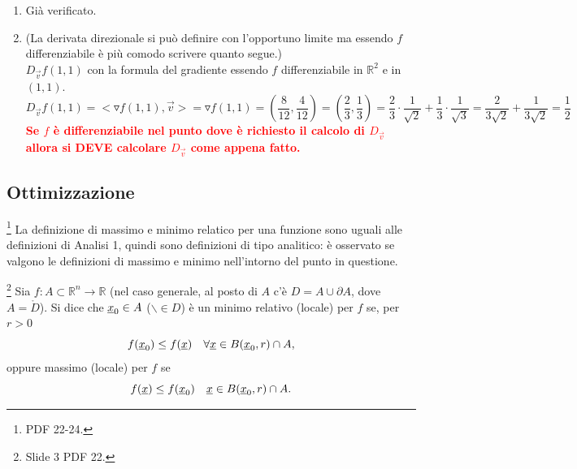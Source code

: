 \begin{example}
\begin{enumerate}
\begin{enumerate}
		\paragraph{Intermezzo:} $\rho^{\frac{15}{3}-4}$  tende a 0 e $\cos\theta)^{\frac{10}{3}}(\sin\theta)^{\frac{5}{3}}+7(\cos\theta)^{\frac{4}{3}}(\sin\theta)^{\frac{11}{3}} $ è uniformemente limitata perché somme di $\sin$ e $\cos$. Lo stesso si può concludere per $f_y$, qundi vale quanto segue. $\qed$\\
		Quindi $f\in C^1(\mathbb{R}^2)$ e $f$ è differenziabile in $\mathbb{R}^2$ (quindi anche in $(0,0)$).
		\item Già verificato.
		\item (La derivata direzionale si può definire con l'opportuno limite ma essendo $f$ differenziabile è più comodo scrivere quanto segue.)\\
		$D_{\vec{v}}f(1,1)$ con la formula del gradiente essendo $f$ differenziabile in $\mathbb{R}^2$ e in $(1,1)$.
		\begin{equation*}
			D_{\vec{v}}f(1,1) = <\triangledown f(1,1), \vec{v}> = \triangledown f(1,1) = \left(\frac{8}{12}, \frac{4}{12}\right) = \left(\frac{2}{3}, \frac{1}{3}\right) = \frac{2}{3}\cdot\frac{1}{\sqrt{2}} + \frac{1}{3}\cdot\frac{1}{\sqrt{3}} = \frac{2}{3\sqrt{2}} + \frac{1}{3\sqrt 2} = \frac{1}{2}
		\end{equation*}
		\textcolor{red}{\textbf{Se $f$ è differenziabile nel punto dove è richiesto il calcolo di $D_{\vec{v}}$ allora si DEVE calcolare $D_{\vec{v}}$ come appena fatto.}}
	\end{enumerate}
	\end{enumerate}
\end{example}

\subsection{Ottimizzazione}
\footnote{PDF 22-24.}
La definizione di massimo e minimo relatico per una funzione sono uguali alle definizioni di Analisi 1, quindi sono definizioni di tipo analitico: è osservato se valgono le definizioni di massimo e minimo nell'intorno del punto in questione.

\begin{definition}\label{def:minimo_massimo_locale_an2}\footnote{Slide 3 PDF 22.}
	Sia $f:A\subset\mathbb{R}^n\rightarrow\mathbb{R}$ (nel caso generale, al posto di $A$ c'è $D=A\cup\partial A$, dove $A=\mathring D$). Si dice che $\uline x_0\in A$ ($\backslash\in D$) è un minimo relativo (locale) per $f$ se, per $r>0$
	\begin{equation*}
		f(\uline x_0)\leq f(\uline x)\quad \forall\uline x\in B(\uline x_0,r)\cap A,
	\end{equation*}
	oppure massimo (locale) per $f$ se
	\begin{equation*}
		f(\uline x) \leq f(\uline x_0)\quad \uline x\in B(\uline x_0, r)\cap A.
	\end{equation*}
\end{definition}

